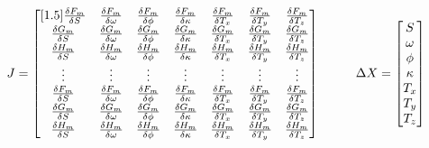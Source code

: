 \[
J = \begin{bmatrix}[1.5]
\ddx{F_m}{S} & \ddx{F_m}{\omega} & \ddx{F_m}{\phi} & \ddx{F_m}{\kappa} & \ddx{F_m}{T_x} & \ddx{F_m}{T_y} & \ddx{F_m}{T_z} \\
\ddx{G_m}{S} & \ddx{G_m}{\omega} & \ddx{G_m}{\phi} & \ddx{G_m}{\kappa} & \ddx{G_m}{T_x} & \ddx{G_m}{T_y} & \ddx{G_m}{T_z} \\
\ddx{H_m}{S} & \ddx{H_m}{\omega} & \ddx{H_m}{\phi} & \ddx{H_m}{\kappa} & \ddx{H_m}{T_x} & \ddx{H_m}{T_y} & \ddx{H_m}{T_z} \\
\vdots & \vdots & \vdots& \vdots  & \vdots & \vdots& \vdots \\
\ddx{F_m}{S} & \ddx{F_m}{\omega} & \ddx{F_m}{\phi} & \ddx{F_m}{\kappa} & \ddx{F_m}{T_x} & \ddx{F_m}{T_y} & \ddx{F_m}{T_z} \\
\ddx{G_m}{S} & \ddx{G_m}{\omega} & \ddx{G_m}{\phi} & \ddx{G_m}{\kappa} & \ddx{G_m}{T_x} & \ddx{G_m}{T_y} & \ddx{G_m}{T_z} \\
\ddx{H_m}{S} & \ddx{H_m}{\omega} & \ddx{H_m}{\phi} & \ddx{H_m}{\kappa} & \ddx{H_m}{T_x} & \ddx{H_m}{T_y} & \ddx{H_m}{T_z} \\
\end{bmatrix}
\hspace{1cm}
\Delta X = 
\begin{bmatrix}
S \\
\omega \\
\phi \\
\kappa \\
T_x \\
T_y \\
T_z
\end{bmatrix}
\]
